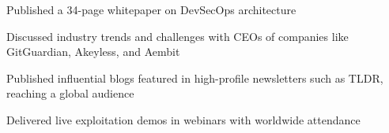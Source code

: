\item Published a 34-page whitepaper on DevSecOps architecture
\item Discussed industry trends and challenges with CEOs of companies like GitGuardian, Akeyless, and Aembit
\item Published influential blogs featured in high-profile newsletters such as TLDR, reaching a global audience
\item Delivered live exploitation demos in webinars with worldwide attendance